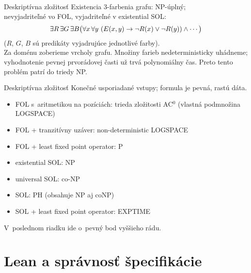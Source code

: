 \documentclass[12pt]{beamer}
\newcommand{\quant}[2]{\mathop{#1#2\/}\nolimits}
\newcommand{\A}{\quant\forall}
\newcommand{\E}{\quant\exists}
\newcommand{\limpl}{\rightarrow}
\begin{document}
\begin{frame}{Deskriptívna zložitosť}
  Existencia 3-farbenia grafu: NP-úplný;\\
  nevyjadriteľné vo FOL, vyjadriteľné v existential SOL:
  \[
    \E R\E G\E B
    \bigl(\A x\A y\ (E(x,y)\limpl\lnot R(x)\lor\lnot R(y))\land\dotsb\bigr)
  \]
  ($R$, $G$, $B$ sú predikáty vyjadrujúce jednotlivé farby).\\

  Za doménu zoberieme vrcholy grafu.
  Množiny farieb nedeterministicky uhádneme;
  vyhodnotenie pevnej prvorádovej časti už trvá polynomiálny čas.
  Preto tento problém patrí do triedy NP.
\end{frame}

\begin{frame}{Deskriptívna zložitosť}
  Konečné usporiadané vstupy; formula je pevná, rastú dáta.
  \begin{itemize}
    \item FOL s~aritmetikou na pozíciách: trieda zložitosti AC$^0$
      (vlastná podmnožina LOGSPACE)
    \item FOL + tranzitívny uzáver: non-deterministic LOGSPACE
    \item FOL + least fixed point operator: P
  \end{itemize}
  \begin{itemize}
    \item existential SOL: NP
    \item universal SOL: co-NP
    \item SOL: PH (obsahuje NP aj coNP)
    \item SOL + least fixed point operator: EXPTIME
  \end{itemize}
  V~poslednom riadku ide o~pevný bod vyššieho rádu.
\end{frame}

\section{Lean a správnosť špecifikácie}
\end{document}
